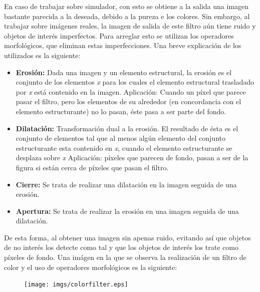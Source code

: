 \hspace{1 cm} En caso de trabajar sobre simulador, con esto se obtiene a la salida una imagen bastante parecida a la deseada, debido a la pureza e los colores. Sin embargo, al trabajar sobre im\'agenes reales, la imagen de salida de este filtro a\'un tiene ruido y objetos de inter\'es imperfectos. Para arreglar esto se utilizan los operadores morfol\'ogicos, que eliminan estas imperfecciones. Una breve explicaci\'on de los utilizados es la siguiente: 

\begin{itemize}
	\item \textbf{Erosi\'on:} Dada una imagen y un elemento estructural, la erosi\'on es el conjunto de los elementos \textit{x} para los cuales el elemento estructural trasladado por \textit{x} est\'a contenido en la imagen. 
	\newline\hspace{1 cm} Aplicaci\'on: Cuando un p\'ixel que parece pasar el filtro, pero los elementos de su alrededor (en concordancia con el elemento estructurante) no lo pasan, \'este pasa a ser parte del fondo. 
	\item \textbf{Dilataci\'on:} Transformaci\'on dual a la erosi\'on. El resultado de \'esta es el conjunto de elementos tal que al menos alg\'un elemento del conjunto estructurante esta contenido en \textit{x}, cuando el elemento estructurante se desplaza sobre \textit{x}
	\newline\hspace{1 cm} Aplicaci\'on: p\'ixeles que parecen de fondo, pasan a ser de la figura si est\'an cerca de p\'ixeles que pasan el filtro.
	\item \textbf{Cierre:} Se trata de realizar una dilataci\'on en la imagen seguida de una erosi\'on.
	\item \textbf{Apertura:} Se trata de realizar la erosi\'on en una imagen seguida de una dilataci\'on.
\end{itemize}


\hspace{1 cm} De esta forma, al obtener una imagen sin apenas ruido, evitando as\'i que objetos de no inter\'es los detecte como tal y que los objetos de inter\'es los trate como p\'ixeles de fondo. Una im\'agen en la que se observa la realizaci\'on de un filtro de color y el uso de operadores morfol\'ogicos es la siguiente:

\begin{figure}[ht]
	\centering
		\texttt{[image: imgs/colorfilter.eps]}
	\label{fig:E_Imagen_baliza}
\end{figure}


